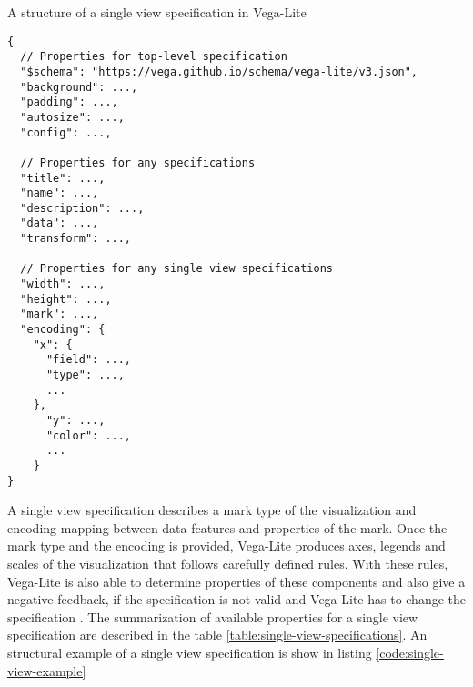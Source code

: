   \begin{listing}[htbp]
  \caption{\label{code:single-view-example}A structure of a single view specification in Vega-Lite \cite{vega-lite-single-view-specification}}
  \begin{verbatim}
{
  // Properties for top-level specification
  "$schema": "https://vega.github.io/schema/vega-lite/v3.json",
  "background": ...,
  "padding": ...,
  "autosize": ...,
  "config": ...,

  // Properties for any specifications
  "title": ...,
  "name": ...,
  "description": ...,
  "data": ...,
  "transform": ...,

  // Properties for any single view specifications
  "width": ...,
  "height": ...,
  "mark": ...,
  "encoding": {
    "x": {
      "field": ...,
      "type": ...,
      ...
    },
      "y": ...,
      "color": ...,
      ...
    }
}
\end{verbatim}
\end{listing}
  A single view specification describes a mark type of the visualization and encoding mapping between data features and properties of the mark. Once the mark type and the encoding is provided, Vega-Lite produces axes, legends and scales of the visualization that follows carefully defined rules. With these rules, Vega-Lite is also able to determine properties of these components and also give a negative feedback, if the specification is not valid and Vega-Lite has to change the specification \cite{vega-lite-single-view-specification}. The summarization of available properties for a single view specification are described in the table \ref{table:single-view-specifications}. An structural example of a single view specification is show in listing \ref{code:single-view-example}

